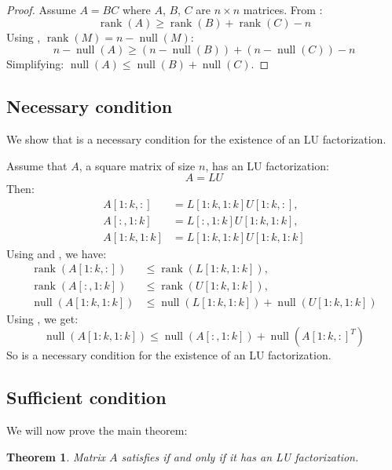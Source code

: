 \documentclass{article}
\DeclareMathOperator{\rk}{rank}
\DeclareMathOperator{\nl}{null}
\newtheorem{theorem}{Theorem}[section]
\begin{document}
\begin{proof}
    Assume $A = BC$ where $A$, $B$, $C$ are $n \times n$ matrices. From :
    \[ \rk(A) \ge \rk(B) + \rk(C) - n \]
    Using , $\rk(M) = n - \nl(M)$:
    \[ n - \nl(A) \ge (n - \nl(B)) + (n - \nl(C)) - n \]
    Simplifying: $\nl(A) \le \nl(B) + \nl(C)$.
\end{proof}

\subsection{Necessary condition}

We show that  is a necessary condition for the existence of an LU factorization.

Assume that $A$, a square matrix of size $n$, has an LU factorization:
\[ A = LU \]
Then:
\begin{align*}
    A[1:k,:]   & = L[1:k,1:k] U[1:k,:], \\
    A[:,1:k]   & = L[:,1:k] U[1:k,1:k], \\
    A[1:k,1:k] & = L[1:k,1:k] U[1:k,1:k]
\end{align*}
Using  and , we have:
\begin{align*}
    \rk(A[1:k,:])   & \le \rk(L[1:k,1:k]), \\
    \rk(A[:,1:k])   & \le \rk(U[1:k,1:k]), \\
    \nl(A[1:k,1:k]) & \le \nl(L[1:k,1:k]) + \nl(U[1:k,1:k])
\end{align*}
Using , we get:
\[
    \nl(A[1:k,1:k]) \le \nl(A[:,1:k]) + \nl({A[1:k,:]}^T)
\]
So  is a necessary condition for the existence of an LU factorization.

\subsection{Sufficient condition}

We will now prove the main theorem:
\begin{theorem}\label{thm:main}
    Matrix $A$ satisfies  if and only if it has an LU factorization.
\end{theorem}
\end{document}
